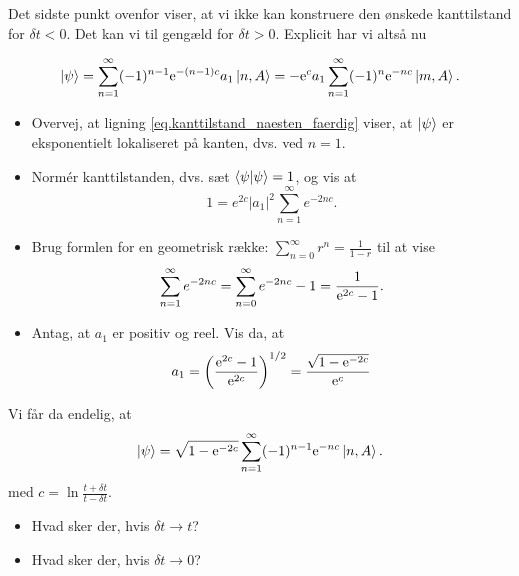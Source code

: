 \documentclass[11pt, a4paper]{article}
\def\te{{\rm e}}
\begin{document}
Det sidste punkt ovenfor viser, at vi ikke kan konstruere den ønskede kanttilstand for $\delta t < 0$. Det kan vi til gengæld for $\delta t > 0$. Explicit har vi altså nu

\begin{equation}
\ket{\psi} = \sum_{n = 1}^{\infty} (-1)^{n - 1}\te^{-(n - 1)c}a_1 \ket{n, A} = - \te^{c}a_1 \sum_{n = 1}^{\infty} (-1)^n\te^{-n c}\ket{m, A}. 
\label{eq.kanttilstand_naesten_faerdig}
\end{equation}

\begin{itemize}
	\item Overvej, at ligning \eqref{eq.kanttilstand_naesten_faerdig} viser, at $\ket{\psi}$ er eksponentielt lokaliseret på kanten, dvs. ved $n = 1$. 

	\item Normér kanttilstanden, dvs. sæt $\braket{\psi|\psi} = 1$, og vis at 
	\begin{equation}
	1 = e^{2c}|a_1|^2 \sum_{n = 1}^{\infty} e^{-2nc}. 
	\end{equation}

	\item Brug formlen for en geometrisk række: $\sum_{n = 0}^{\infty} r^n = \frac{1}{1 - r}$ til at vise
	\begin{equation}
	\sum_{n = 1}^{\infty} e^{-2nc} = \sum_{n = 0}^{\infty} e^{-2nc} - 1 = \frac{1}{\te^{2c} - 1}. 
	\end{equation}

	\item Antag, at $a_1$ er positiv og reel. Vis da, at
	\begin{equation}
	a_1 = \left(\frac{\te^{2c} - 1}{\te^{2c}}\right)^{1/2} = \frac{\sqrt{1 - \te^{-2c}}}{\te^{c}}
	\end{equation}

\end{itemize}

Vi får da endelig, at
\begin{equation}
\ket{\psi} = \sqrt{1 - \te^{-2c}}\sum_{n = 1}^{\infty} (-1)^{n - 1} \te^{-nc}\ket{n, A}. 
\label{eq.kanttilstand_faerdig}
\end{equation}
med $c = \ln \frac{t + \delta t}{t - \delta t}$. 

\begin{itemize}
	\item Hvad sker der, hvis $\delta t \to t$? 

	\item Hvad sker der, hvis $\delta t \to 0$? 
\end{itemize}
\end{document}
